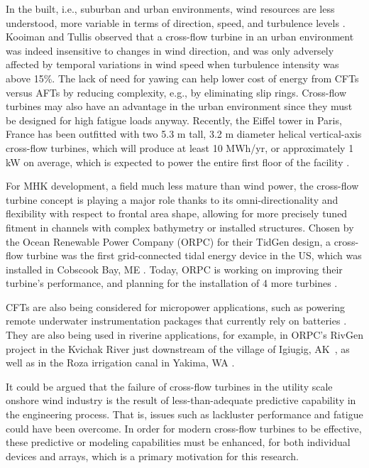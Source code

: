 In the built, i.e., suburban and urban environments, wind resources are less
understood, more variable in terms of direction, speed, and turbulence levels
\cite{Smith2012}. Kooiman and Tullis \cite{Kooiman2010} observed that a
cross-flow turbine in an urban environment was indeed insensitive to changes in
wind direction, and was only adversely affected by temporal variations in wind
speed when turbulence intensity was above 15\%. The lack of need for yawing can
help lower cost of energy from CFTs versus AFTs by reducing complexity, e.g., by
eliminating slip rings. Cross-flow turbines may also have an advantage in the
urban environment since they must be designed for high fatigue loads anyway.
Recently, the Eiffel tower in Paris, France has been outfitted with two 5.3 m
tall, 3.2 m diameter helical vertical-axis cross-flow turbines, which will
produce at least 10 MWh/yr, or approximately 1 kW on average, which is expected
to power the entire first floor of the facility \cite{Lott2015}.

For MHK development, a field much less mature than wind power, the cross-flow
turbine concept is playing a major role thanks to its omni-directionality and
flexibility with respect to frontal area shape, allowing for more precisely
tuned fitment in channels with complex bathymetry or installed structures.
Chosen by the Ocean Renewable Power Company (ORPC) for their TidGen design, a
cross-flow turbine was the first grid-connected tidal energy device in the US,
which was installed in Cobscook Bay, ME \cite{ORPC2012}. Today, ORPC is working
on improving their turbine's performance, and planning for the installation of 4
more turbines \cite{Nelson2013}. 

CFTs are also being considered for micropower applications, such as powering
remote underwater instrumentation packages that currently rely on batteries
\cite{Polagye2013b}. They are also being used in riverine applications, for
example, in ORPC's RivGen project in the Kvichak River just downstream of the
village of Igiugig, AK~\cite{Forbush2015}, as well as in the Roza irrigation
canal in Yakima, WA \cite{Gunawan2014}.

It could be argued that the failure of cross-flow turbines in the utility scale
onshore wind industry is the result of less-than-adequate predictive capability
in the engineering process. That is, issues such as lackluster performance and
fatigue could have been overcome. In order for modern cross-flow turbines to be
effective, these predictive or modeling capabilities must be enhanced, for both
individual devices and arrays, which is a primary motivation for this research.



